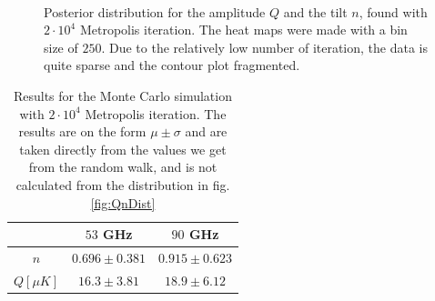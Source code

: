 \documentclass{emulateapj}
\begin{document}
\begin{figure}[t!]
\centering
{}\\
\caption{Posterior distribution for the amplitude $Q$ and the tilt $n$, found with $2\cdot 10^4$ Metropolis iteration. The heat maps were made with a bin size of $250$. Due to the relatively low number of iteration, the data is quite sparse and the contour plot fragmented. }
\end{figure}

\begin{table}[t!]
\centering
\begin{tabular}{c | c | c}
& $53$ GHz & $90$ GHz \\
\hline
$n$ & $0.696 \pm 0.381$ & $0.915 \pm 0.623$\\
$Q[\mu K]$ & $16.3 \pm 3.81$ & $18.9 \pm 6.12$
\end{tabular}
\caption{Results for the Monte Carlo simulation with $2\cdot 10^4$ Metropolis iteration. The results are on the form $\mu \pm \sigma$ and are taken directly from the values we get from the random walk, and is not calculated from the distribution in fig. \ref{fig:QnDist}}
\label{tab:results}
\end{table}
\end{document}
